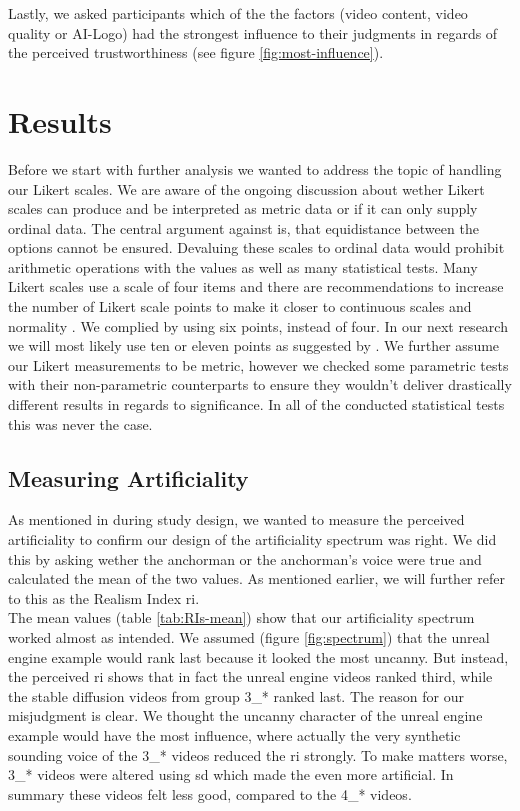 \documentclass[
  a4paper,  %
  twoside,  %
  bibliography=totoc,
  headsepline,
  cleardoublepage=empty,
  parskip=half,
  draft=false
]{scrbook}
\begin{document}
Lastly, we asked participants which of the the factors (video content, video quality or AI-Logo) had the strongest influence to their judgments in regards of the perceived trustworthiness (see figure \ref{fig:most-influence}).

\section{Results}
\label{sec:results}

Before we start with further analysis we wanted to address the topic of handling our Likert scales. We are aware of the ongoing discussion about wether Likert scales can produce and be interpreted as metric data or if it can only supply ordinal data. The central argument against is, that equidistance between the options cannot be ensured. Devaluing these scales to ordinal data would prohibit arithmetic operations with the values as well as many statistical tests. Many Likert scales use a scale of four items and there are recommendations to increase the number of Likert scale points to make it closer to continuous scales and normality \cite{wuCanLikertScales2017a}. We complied by using six points, instead of four. In our next research we will most likely use ten or eleven points as suggested by . We further assume our Likert measurements to be metric, however we checked some parametric tests with their non-parametric counterparts to ensure they wouldn't deliver drastically different results in regards to significance. In all of the conducted statistical tests this was never the case.

\subsection{Measuring Artificiality}

As mentioned in during study design, we wanted to measure the perceived artificiality to confirm our design of the artificiality spectrum was right. We did this by asking wether the anchorman or the anchorman's voice were true and calculated the mean of the two values. As mentioned earlier, we will further refer to this as the Realism Index \gls{ri}. \\
The mean values (table \ref{tab:RIs-mean}) show that our artificiality spectrum worked almost as intended. We assumed (figure \ref{fig:spectrum}) that the unreal engine example would rank last because it looked the most uncanny. But instead, the perceived \gls{ri} shows that in fact the unreal engine videos ranked third, while the stable diffusion videos from group 3\_* ranked last. The reason for our misjudgment is clear. We thought the uncanny character of the unreal engine example would have the most influence, where actually the very synthetic sounding voice of the 3\_* videos reduced the \gls{ri} strongly. To make matters worse, 3\_* videos were altered using \gls{sd} which made the even more artificial. In summary these videos felt less good, compared to the 4\_* videos. 
\end{document}

